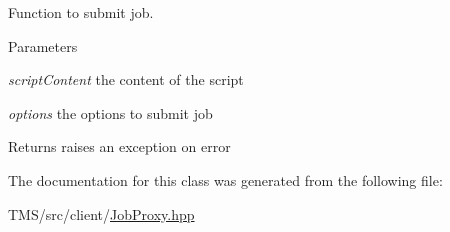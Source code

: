 Function to submit job. 


\begin{DoxyParams}{Parameters}
\item[{\em scriptContent}]the content of the script \item[{\em options}]the options to submit job \end{DoxyParams}
\begin{DoxyReturn}{Returns}
raises an exception on error 
\end{DoxyReturn}


The documentation for this class was generated from the following file:\begin{DoxyCompactItemize}
\item 
TMS/src/client/\hyperlink{JobProxy_8hpp}{JobProxy.hpp}\end{DoxyCompactItemize}
